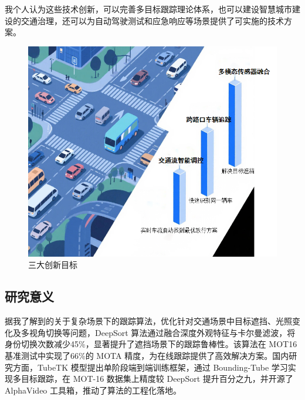 我个人认为这些技术创新，可以完善多目标跟踪理论体系，也可以建设智慧城市建设的交通治理，还可以为自动驾驶测试和应急响应等场景提供了可实施的技术方案。




\begin{figure}[htbp] %
	\centering
	\includegraphics[width=1\textwidth]{p25} %
	\caption{三大创新目标} %
	\label{fig:p25} %
\end{figure}













\subsection{研究意义}


据我了解到的关于复杂场景下的跟踪算法，优化针对交通场景中目标遮挡、光照变化及多视角切换等问题，DeepSort 算法通过融合深度外观特征与卡尔曼滤波，将身份切换次数减少45\%，显著提升了遮挡场景下的跟踪鲁棒性。该算法在 MOT16 基准测试中实现了66\%的 MOTA 精度，为在线跟踪提供了高效解决方案。国内研究方面，TubeTK 模型提出单阶段端到端训练框架，通过 Bounding-Tube 学习实现多目标跟踪，在 MOT-16 数据集上精度较 DeepSort 提升百分之九，并开源了 AlphaVideo 工具箱，推动了算法的工程化落地。


